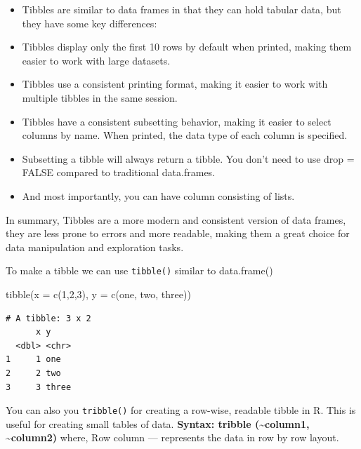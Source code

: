 \documentclass[
  letterpaper,
]{book}
\newenvironment{Shaded}{\begin{snugshade}}{\end{snugshade}}
\newcommand{\AttributeTok}[1]{\textcolor[rgb]{0.40,0.45,0.13}{#1}}
\newcommand{\DecValTok}[1]{\textcolor[rgb]{0.68,0.00,0.00}{#1}}
\newcommand{\FunctionTok}[1]{\textcolor[rgb]{0.28,0.35,0.67}{#1}}
\newcommand{\NormalTok}[1]{\textcolor[rgb]{0.00,0.23,0.31}{#1}}
\newcommand{\StringTok}[1]{\textcolor[rgb]{0.13,0.47,0.30}{#1}}
\begin{document}
\begin{itemize}
\item
  Tibbles are similar to data frames in that they can hold tabular data,
  but they have some key differences:
\item
  Tibbles display only the first 10 rows by default when printed, making
  them easier to work with large datasets.
\item
  Tibbles use a consistent printing format, making it easier to work
  with multiple tibbles in the same session.
\item
  Tibbles have a consistent subsetting behavior, making it easier to
  select columns by name. When printed, the data type of each column is
  specified.
\item
  Subsetting a tibble will always return a tibble. You don't need to use
  drop = FALSE compared to traditional data.frames.
\item
  And most importantly, you can have column consisting of lists.
\end{itemize}

In summary, Tibbles are a more modern and consistent version of data
frames, they are less prone to errors and more readable, making them a
great choice for data manipulation and exploration tasks.

To make a tibble we can use \texttt{tibble()} similar to data.frame()

\begin{Shaded}
\begin{Highlighting}[]
\FunctionTok{tibble}\NormalTok{(}\AttributeTok{x =} \FunctionTok{c}\NormalTok{(}\DecValTok{1}\NormalTok{,}\DecValTok{2}\NormalTok{,}\DecValTok{3}\NormalTok{),}
       \AttributeTok{y =} \FunctionTok{c}\NormalTok{(}\StringTok{\textquotesingle{}one\textquotesingle{}}\NormalTok{, }\StringTok{\textquotesingle{}two\textquotesingle{}}\NormalTok{, }\StringTok{\textquotesingle{}three\textquotesingle{}}\NormalTok{))}
\end{Highlighting}
\end{Shaded}

\begin{verbatim}
# A tibble: 3 x 2
      x y    
  <dbl> <chr>
1     1 one  
2     2 two  
3     3 three
\end{verbatim}

You can also you \texttt{tribble()} for creating a row-wise, readable
tibble in R. This is useful for creating small tables of data.
\textbf{Syntax: tribble (\textasciitilde column1,
\textasciitilde column2)} where, Row column --- represents the data in
row by row layout.
\end{document}

